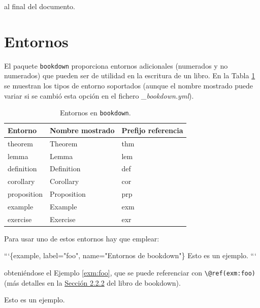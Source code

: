 \documentclass[]{book}
\newenvironment{Shaded}{\begin{snugshade}}{\end{snugshade}}
\newcommand{\NormalTok}[1]{#1}
\theoremstyle{definition}
\theoremstyle{definition}
\theoremstyle{definition}
\theoremstyle{remark}
\let\BeginKnitrBlock\begin \let\EndKnitrBlock\end
\begin{document}
al final del documento.

\section{Entornos}\label{entornos}

El paquete \texttt{bookdown} proporciona entornos adicionales (numerados
y no numerados) que pueden ser de utilidad en la escritura de un libro.
En la Tabla \ref{tab:theorem-envs} se muestran los tipos de entorno
soportados (aunque el nombre mostrado puede variar si se cambió esta
opción en el fichero \emph{\_bookdown.yml}).



\begin{table}

\caption{\label{tab:theorem-envs}Entornos en \texttt{bookdown}.}
\centering
\begin{tabular}[t]{lll}
\toprule
Entorno & Nombre mostrado & Prefijo referencia\\
\midrule
theorem & Theorem & thm\\
lemma & Lemma & lem\\
definition & Definition & def\\
corollary & Corollary & cor\\
proposition & Proposition & prp\\
\addlinespace
example & Example & exm\\
exercise & Exercise & exr\\
\bottomrule
\end{tabular}
\end{table}

Para usar uno de estos entornos hay que emplear:

\begin{Shaded}
\begin{Highlighting}[]
\NormalTok{```\{example, label="foo", name="Entornos de bookdown"\}}
\NormalTok{Esto es un ejemplo.}
\NormalTok{```}
\end{Highlighting}
\end{Shaded}

obteniéndose el Ejemplo \ref{exm:foo}, que se puede referenciar con
\texttt{\textbackslash{}@ref(exm:foo)} (más detalles en la
\href{https://bookdown.org/yihui/bookdown/markdown-extensions-by-bookdown.html\#theorems}{Sección
2.2.2} del libro de bookdown).

\BeginKnitrBlock{example}[Entornos de bookdown]
\protect\hypertarget{exm:foo}{}{\label{exm:foo} {} }Esto es un ejemplo.
\EndKnitrBlock{example}
\end{document}
